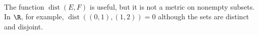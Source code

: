 \begin{remark} \label{rem:set-distance-is-not-subset-metric} \\
The function $\operatorname{dist}(E,F)$ is useful, but it is not a metric on nonempty subsets.\\
In $\R$, for example, $\operatorname{dist}((0,1),(1,2))=0$ although the sets are distinct and disjoint.
\end{remark}
